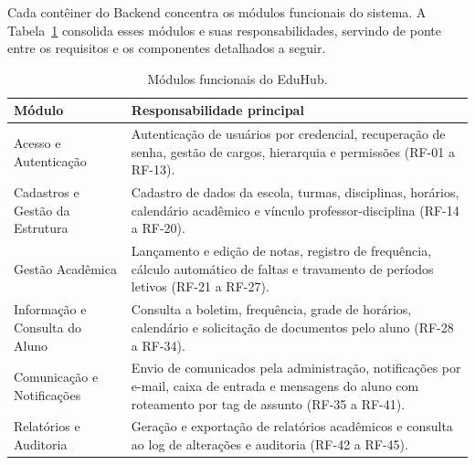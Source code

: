 Cada contêiner do Backend concentra os módulos funcionais do sistema. A
Tabela~\ref{tab:modulos} consolida esses módulos e suas responsabilidades,
servindo de ponte entre os requisitos e os componentes detalhados a seguir.

\begin{table}[H]
\centering
\caption{Módulos funcionais do EduHub.}
\label{tab:modulos}
\begin{tabularx}{\textwidth}{p{} X}
\toprule
\textbf{Módulo} & \textbf{Responsabilidade principal} \\
\midrule
Acesso e Autenticação & Autenticação de usuários por credencial, recuperação
de senha, gestão de cargos, hierarquia e permissões (RF-01 a RF-13). \\
Cadastros e Gestão da Estrutura & Cadastro de dados da escola, turmas,
disciplinas, horários, calendário acadêmico e vínculo professor-disciplina
(RF-14 a RF-20). \\
Gestão Acadêmica & Lançamento e edição de notas, registro de frequência,
cálculo automático de faltas e travamento de períodos letivos (RF-21 a
RF-27). \\
Informação e Consulta do Aluno & Consulta a boletim, frequência, grade de
horários, calendário e solicitação de documentos pelo aluno (RF-28 a
RF-34). \\
Comunicação e Notificações & Envio de comunicados pela administração,
notificações por e-mail, caixa de entrada e mensagens do aluno com roteamento
por tag de assunto (RF-35 a RF-41). \\
Relatórios e Auditoria & Geração e exportação de relatórios acadêmicos e
consulta ao log de alterações e auditoria (RF-42 a RF-45). \\
\bottomrule
\end{tabularx}
\end{table}

